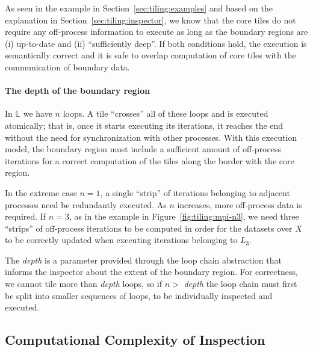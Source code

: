 As seen in the example in Section~\ref{sec:tiling:examples} and based on the explanation in Section~\ref{sec:tiling:inspector}, we know that the core tiles do not require any off-process information to execute as long as the boundary regions are (i) up-to-date and (ii) ``sufficiently deep''. If both conditions hold, the execution is semantically correct and it is safe to overlap computation of core tiles with the communication of boundary data. 


\paragraph{The depth of the boundary region}
In $\mathbb{L}$ we have $n$ loops. A tile ``crosses'' all of these loops and is executed atomically; that is, once it starts executing its iterations, it reaches the end without the need for synchronization with other processes. With this execution model, the boundary region must include a sufficient amount of off-process iterations for a correct computation of the tiles along the border with the core region. 

In the extreme case $n=1$, a single ``strip'' of iterations belonging to adjacent processes need be redundantly executed. As $n$ increases, more off-process data is required. If $n=3$, as in the example in Figure~\ref{fig:tiling:mpi-n3}, we need three ``strips'' of off-process iterations to be computed in order for the datasets over $X$ to be correctly updated when executing iterations belonging to $L_3$.

The {\em depth} is a parameter provided through the loop chain abstraction that informs the inspector about the extent of the boundary region. For correctness, we cannot tile more than {\em depth} loops, so if $n >$ {\em depth} the loop chain must first be split into smaller sequences of loops, to be individually inspected and executed. 





\subsection{Computational Complexity of Inspection}

